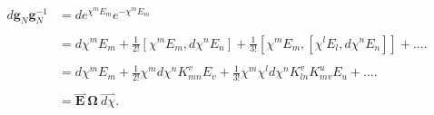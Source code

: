 \begin{equation}
\begin{aligned}
d\mathbf{g}_{N}\mathbf{g}_{N}^{-1}&=de^{\chi ^{m}E_{m}}e^{-\chi ^{m}E_{m}}\\
\\
&=d\chi ^{m}E_{m}+\frac{1}{2!}[\chi ^{m}E_{m},d%
\chi ^{n}E_{n}]+\frac{1}{3!}[\chi ^{m}E_{m},[\chi ^{l}E_{l},d\chi
^{n}E_{n}]]+....\\
\\
&=d\chi ^{m}E_{m}+\frac{1}{2!}\chi ^{m}d\chi
^{n}K_{mn}^{v}E_{v}+\frac{1}{3!}\chi ^{m}\chi ^{l}d\chi
^{n}K_{ln}^{v}K_{mv}^{u}E_{u}+....\\
\\
&=\overset{\rightharpoonup}{\mathbf{E
}}\:\mathbf{\Omega }\:\overset{\rightharpoonup }{d\chi }.
\end{aligned}
\end{equation}

